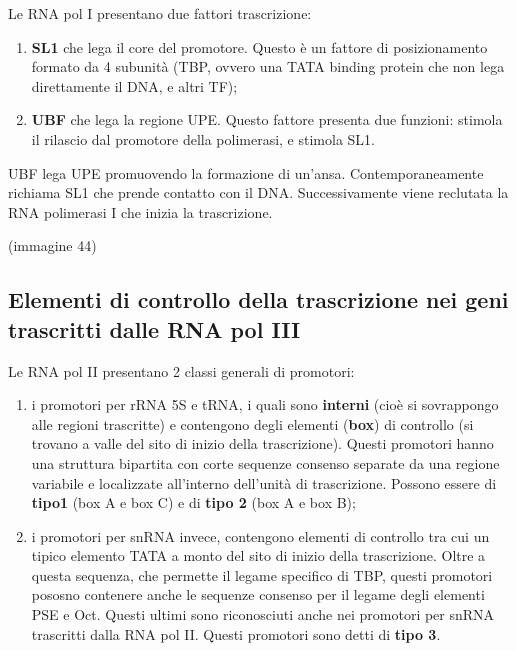 \documentclass[11pt]{book}
\begin{document}
Le RNA pol I presentano due fattori trascrizione:

\begin{enumerate}
\def\labelenumi{\arabic{enumi}.}
\itemsep1pt\parskip0pt
\item
  \textbf{SL1} che lega il core del promotore. Questo è un fattore di
  posizionamento formato da 4 subunità (TBP, ovvero una TATA binding
  protein che non lega direttamente il DNA, e altri TF);
\item
  \textbf{UBF} che lega la regione UPE. Questo fattore presenta due
  funzioni: stimola il rilascio dal promotore della polimerasi, e
  stimola SL1.
\end{enumerate}

UBF lega UPE promuovendo la formazione di un'ansa. Contemporaneamente
richiama SL1 che prende contatto con il DNA. Successivamente viene
reclutata la RNA polimerasi I che inizia la trascrizione.

(immagine 44)

\subsection{Elementi di controllo della trascrizione nei geni
trascritti dalle RNA pol
III}\label{elementi-di-controllo-della-trascrizione-nei-geni-trascritti-dalle-rna-pol-iii}

Le RNA pol II presentano 2 classi generali di promotori:

\begin{enumerate}
\def\labelenumi{\arabic{enumi}.}
\itemsep1pt\parskip0pt
\item
  i promotori per rRNA 5S e tRNA, i quali sono \textbf{interni} (cioè si
  sovrappongo alle regioni trascritte) e contengono degli elementi
  (\textbf{box}) di controllo (si trovano a valle del sito di inizio
  della trascrizione). Questi promotori hanno una struttura bipartita
  con corte sequenze consenso separate da una regione variabile e
  localizzate all'interno dell'unità di trascrizione. Possono essere di
  \textbf{tipo1} (box A e box C) e di \textbf{tipo 2} (box A e box B);
\item
  i promotori per snRNA invece, contengono elementi di controllo tra cui
  un tipico elemento TATA a monto del sito di inizio della trascrizione.
  Oltre a questa sequenza, che permette il legame specifico di TBP,
  questi promotori pososno contenere anche le sequenze consenso per il
  legame degli elementi PSE e Oct. Questi ultimi sono riconosciuti anche
  nei promotori per snRNA trascritti dalla RNA pol II. Questi promotori
  sono detti di \textbf{tipo 3}.
\end{enumerate}
\end{document}
